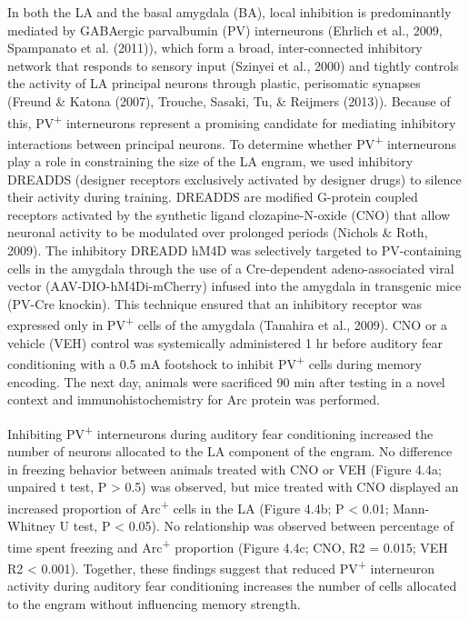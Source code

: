 \documentclass[12pt,a4paper,]{report}
\begin{document}
In both the LA and the basal amygdala (BA), local inhibition is
predominantly mediated by GABAergic parvalbumin (PV) interneurons
(Ehrlich et al., 2009, Spampanato et al. (2011)), which form a broad,
inter-connected inhibitory network that responds to sensory input
(Szinyei et al., 2000) and tightly controls the activity of LA principal
neurons through plastic, perisomatic synapses (Freund \& Katona (2007),
Trouche, Sasaki, Tu, \& Reijmers (2013)). Because of this,
PV\textsuperscript{+} interneurons represent a promising candidate for
mediating inhibitory interactions between principal neurons. To
determine whether PV\textsuperscript{+} interneurons play a role in
constraining the size of the LA engram, we used inhibitory DREADDS
(designer receptors exclusively activated by designer drugs) to silence
their activity during training. DREADDS are modified G-protein coupled
receptors activated by the synthetic ligand clozapine-N-oxide (CNO) that
allow neuronal activity to be modulated over prolonged periods (Nichols
\& Roth, 2009). The inhibitory DREADD hM4D was selectively targeted to
PV-containing cells in the amygdala through the use of a Cre-dependent
adeno-associated viral vector (AAV-DIO-hM4Di-mCherry) infused into the
amygdala in transgenic mice (PV-Cre knockin). This technique ensured
that an inhibitory receptor was expressed only in PV\textsuperscript{+}
cells of the amygdala (Tanahira et al., 2009). CNO or a vehicle (VEH)
control was systemically administered 1 hr before auditory fear
conditioning with a 0.5 mA footshock to inhibit PV\textsuperscript{+}
cells during memory encoding. The next day, animals were sacrificed 90
min after testing in a novel context and immunohistochemistry for Arc
protein was performed.

Inhibiting PV\textsuperscript{+} interneurons during auditory fear
conditioning increased the number of neurons allocated to the LA
component of the engram. No difference in freezing behavior between
animals treated with CNO or VEH (Figure 4.4a; unpaired t test, P
\textgreater{} 0.5) was observed, but mice treated with CNO displayed an
increased proportion of Arc\textsuperscript{+} cells in the LA (Figure
4.4b; P \textless{} 0.01; Mann-Whitney U test, P \textless{} 0.05). No
relationship was observed between percentage of time spent freezing and
Arc\textsuperscript{+} proportion (Figure 4.4c; CNO, R2 = 0.015; VEH R2
\textless{} 0.001). Together, these findings suggest that reduced
PV\textsuperscript{+} interneuron activity during auditory fear
conditioning increases the number of cells allocated to the engram
without influencing memory strength.
\end{document}
